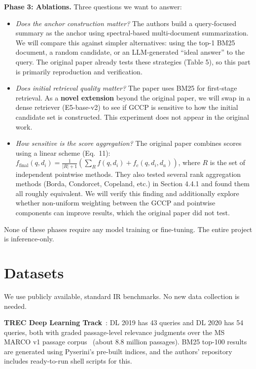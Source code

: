 \documentclass[conference]{IEEEtran}
\begin{document}
\textbf{Phase 3: Ablations.}
Three questions we want to answer:
\begin{itemize}[nosep,leftmargin=1em]
    \item \textit{Does the anchor construction matter?} The authors build a query-focused summary as the anchor using spectral-based multi-document summarization. We will compare this against simpler alternatives: using the top-1 BM25 document, a random candidate, or an LLM-generated ``ideal answer'' to the query. The original paper already tests these strategies (Table 5), so this part is primarily reproduction and verification.
    \item \textit{Does initial retrieval quality matter?} The paper uses BM25 for first-stage retrieval. As a \textbf{novel extension} beyond the original paper, we will swap in a dense retriever (E5-base-v2) to see if GCCP is sensitive to how the initial candidate set is constructed. This experiment does not appear in the original work.
    \item \textit{How sensitive is the score aggregation?} The original paper combines scores using a linear scheme (Eq.~11): $f_{\text{final}}(q, d_i) = \frac{1}{|R|+1}\left(\sum_R f(q, d_i) + f_c(q, d_i, d_a)\right)$, where $R$ is the set of independent pointwise methods. They also tested several rank aggregation methods (Borda, Condorcet, Copeland, etc.) in Section 4.4.1 and found them all roughly equivalent. We will verify this finding and additionally explore whether non-uniform weighting between the GCCP and pointwise components can improve results, which the original paper did not test.
\end{itemize}

None of these phases require any model training or fine-tuning. The entire project is inference-only.

\section{Datasets}

We use publicly available, standard IR benchmarks. No new data collection is needed.

\textbf{TREC Deep Learning Track}~\cite{craswell2020overview}: DL 2019 has 43 queries and DL 2020 has 54 queries, both with graded passage-level relevance judgments over the MS MARCO v1 passage corpus~\cite{bajaj2016msmarco} (about 8.8 million passages). BM25 top-100 results are generated using Pyserini's pre-built indices, and the authors' repository includes ready-to-run shell scripts for this.
\end{document}
